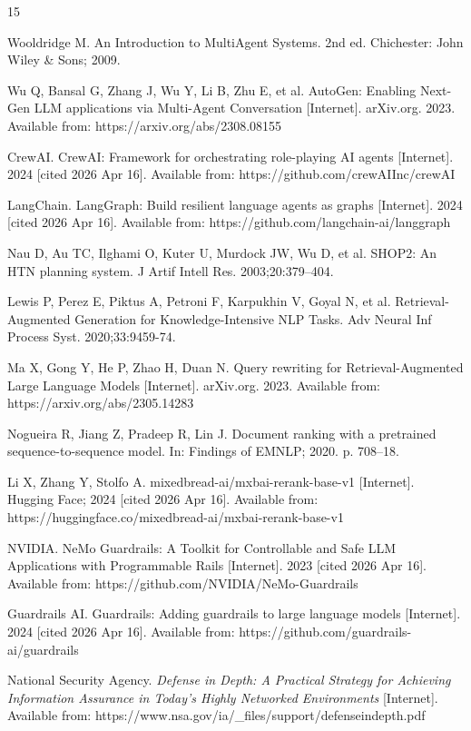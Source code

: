 \documentclass[11pt]{article}
\begin{document}
\begin{thebibliography}{15}

Wooldridge M. An Introduction to MultiAgent Systems. 2nd ed. Chichester: John Wiley \& Sons; 2009.

Wu Q, Bansal G, Zhang J, Wu Y, Li B, Zhu E, et al. AutoGen: Enabling Next-Gen LLM applications via Multi-Agent Conversation [Internet]. arXiv.org. 2023. Available from: https://arxiv.org/abs/2308.08155

CrewAI. CrewAI: Framework for orchestrating role-playing AI agents [Internet]. 2024 [cited 2026 Apr 16]. Available from: https://github.com/crewAIInc/crewAI

LangChain. LangGraph: Build resilient language agents as graphs [Internet]. 2024 [cited 2026 Apr 16]. Available from: https://github.com/langchain-ai/langgraph

Nau D, Au TC, Ilghami O, Kuter U, Murdock JW, Wu D, et al. SHOP2: An HTN planning system. J Artif Intell Res. 2003;20:379–404.

Lewis P, Perez E, Piktus A, Petroni F, Karpukhin V, Goyal N, et al. Retrieval-Augmented Generation for Knowledge-Intensive NLP Tasks. Adv Neural Inf Process Syst. 2020;33:9459-74.

Ma X, Gong Y, He P, Zhao H, Duan N. Query rewriting for Retrieval-Augmented Large Language Models [Internet]. arXiv.org. 2023. Available from: https://arxiv.org/abs/2305.14283

Nogueira R, Jiang Z, Pradeep R, Lin J. Document ranking with a pretrained sequence-to-sequence model. In: Findings of EMNLP; 2020. p. 708–18.

Li X, Zhang Y, Stolfo A. mixedbread-ai/mxbai-rerank-base-v1 [Internet]. Hugging Face; 2024 [cited 2026 Apr 16]. Available from: https://huggingface.co/mixedbread-ai/mxbai-rerank-base-v1

NVIDIA. NeMo Guardrails: A Toolkit for Controllable and Safe LLM Applications with Programmable Rails [Internet]. 2023 [cited 2026 Apr 16]. Available from: https://github.com/NVIDIA/NeMo-Guardrails

Guardrails AI. Guardrails: Adding guardrails to large language models [Internet]. 2024 [cited 2026 Apr 16]. Available from: https://github.com/guardrails-ai/guardrails

National Security Agency. \textit{Defense in Depth: A Practical Strategy for Achieving Information Assurance in Today's Highly Networked Environments} [Internet]. Available from: https://www.nsa.gov/ia/\_files/support/defenseindepth.pdf


\end{thebibliography}
\end{document}
